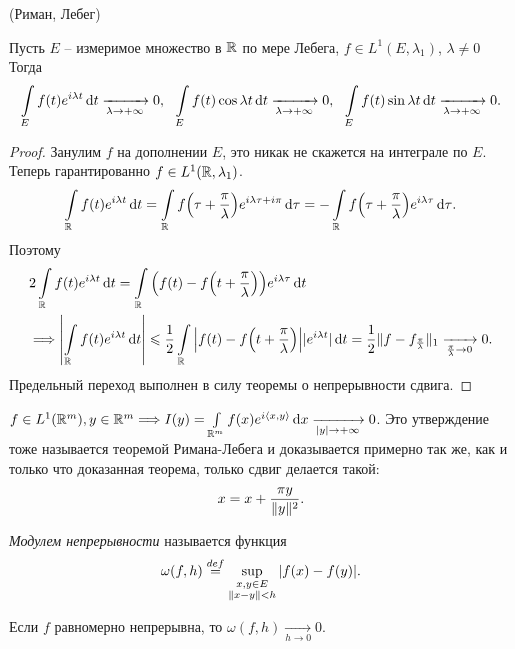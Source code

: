 \begin{theorem}(Риман, Лебег)
   
    Пусть $E$ -- измеримое множество в $\mathbb{R}$ по мере Лебега, $f \in L^1(E, \lambda_1)$,
    $\lambda \neq 0$ Тогда
    \[
        \int\limits_E{f(t) e^{i \lambda t} \,\mathrm{d} t} \xrightarrow[\lambda \to +\infty]{} 0,~~
        \int\limits_E{f(t) \cos{\lambda t} \,\mathrm{d} t} \xrightarrow[\lambda \to +\infty]{} 0,~~
        \int\limits_E{f(t) \sin{\lambda t} \,\mathrm{d} t} \xrightarrow[\lambda \to +\infty]{} 0
    .\]
\end{theorem}
\begin{proof}
    Занулим $f$ на дополнении $E$, это никак не скажется на интеграле по $E$.
    Теперь гарантированно $f \in L^1(\mathbb{R}, \lambda_1)$.
    \[
        \intl_\R{f(t) e^{i \lambda t} \dd t} = \intl_\R{f\parens*{\tau + \frac{\pi}{\lambda}}
        e^{i \lambda \tau + i \pi} \dd \tau} = -\intl_\R{f\parens*{\tau + \frac{\pi}{\lambda}} 
        e^{i \lambda \tau}\dd \tau}
    .\]
    Поэтому
    \begin{align*}
        &2 \intl_\R{f(t) e^{i \lambda t} \dd t} = \intl_\R{\parens*{f(t) -
        f\parens*{t + \frac{\pi}{\lambda}}} e^{i \lambda \tau} \dd t} \\
        &\Lra \abs*{\intl_\R{f(t) e^{i \lambda t} \dd t}} \leqslant
        \frac{1}{2} \intl_\R{\abs*{f(t) - f\parens*{t + \frac{\pi}{\lambda}}}
        |e^{i \lambda t}| \dd t} = \frac{1}{2} \norm{f - f_{\frac{\pi}{\lambda}}}_1 
        \xrightarrow[\frac{\pi}{\lambda} \to 0]{} 0
    .\end{align*}
    Предельный переход выполнен в силу теоремы о непрерывности сдвига.
\end{proof}

\begin{remark}
    $f \in L^1(\mathbb{R}^m), y \in \mathbb{R}^m \Longrightarrow I(y) = \int\limits_{\mathbb{R}^m}{f(x) e^{i \langle x, y \rangle} \,\mathrm{d} x}
    \xrightarrow[|y| \to +\infty]{} 0$. Это утверждение тоже называется теоремой
    Римана-Лебега и доказывается примерно так же, как и только что доказанная
    теорема, только сдвиг делается такой:
    \[
        x = x + \frac{\pi y}{\lVert y\rVert^2} 
    .\]
\end{remark}

\begin{definition}
    \textit{Модулем непрерывности} называется функция
    \[
        \omega(f, h) \overset{def}{\underset{}{=}} \sup_{\substack{x, y \in E \\ \lVert x - y\rVert < h}}{|f(x) - f(y)|}
    .\]
\end{definition}

\begin{remark}
    Если $f$ равномерно непрерывна, то $\omega(f, h) \xrightarrow[h \to 0]{} 0$.
\end{remark}

